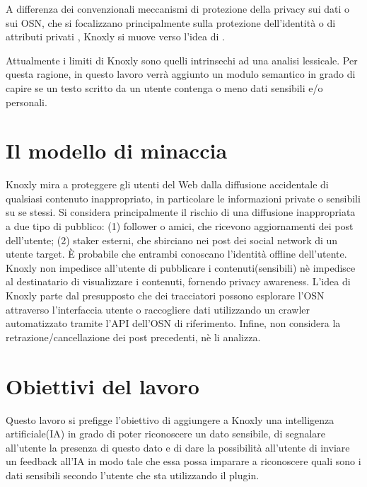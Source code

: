 A differenza dei convenzionali meccanismi di protezione della privacy sui dati o sui OSN, che si focalizzano principalmente sulla protezione dell’identità o di attributi privati \cite{collective-data, diff-privacy, urwho, inferr-privacy, protection-private, stalking}, Knoxly si muove verso l’idea di .

Attualmente i limiti di Knoxly sono quelli intrinsechi ad una analisi lessicale. Per questa ragione, in questo lavoro verrà aggiunto un modulo semantico in grado di capire se un testo scritto da un utente contenga o meno dati sensibili e/o personali.

\section{Il modello di minaccia}
Knoxly mira a proteggere gli utenti del Web dalla diffusione accidentale di qualsiasi contenuto inappropriato, in particolare le informazioni private o sensibili su se stessi. Si considera principalmente il rischio di una diffusione inappropriata a due tipo di pubblico: (1) follower o amici, che ricevono aggiornamenti dei post dell'utente; (2) staker esterni, che sbirciano nei post dei social network di un utente target. È probabile che entrambi conoscano l'identità offline dell'utente. Knoxly non impedisce all'utente di pubblicare i contenuti(sensibili) nè impedisce al destinatario di visualizzare i contenuti, fornendo privacy awareness. L'idea di Knoxly parte dal presupposto che dei tracciatori possono esplorare l'OSN attraverso l'interfaccia utente o raccogliere dati utilizzando un crawler automatizzato tramite l'API dell'OSN di riferimento. Infine, non considera la retrazione/cancellazione dei post precedenti, nè li analizza.

\section{Obiettivi del lavoro}
Questo lavoro si prefigge l'obiettivo di aggiungere a Knoxly una intelligenza artificiale(IA) in grado di poter riconoscere un dato sensibile, di segnalare all'utente la presenza di questo dato e di dare la possibilità all'utente di inviare un feedback all'IA in modo tale che essa possa imparare a riconoscere quali sono i dati sensibili secondo l'utente che sta utilizzando il plugin.
